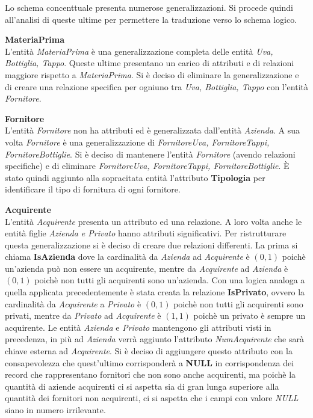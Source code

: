 Lo schema concenttuale presenta numerose generalizzazioni. Si procede quindi all'analisi di queste ultime per permettere la traduzione verso lo schema logico.
\begin{flushleft}
	\textbf{\large{MateriaPrima}}\\
	L'entità \emph{MateriaPrima} è una generalizzazione completa delle entità \emph{Uva, Bottiglia, Tappo}. Queste ultime presentano un carico di attributi e di relazioni maggiore rispetto a \emph{MateriaPrima}. Si è deciso di eliminare la generalizzazione e di creare una relazione specifica per ogniuno tra \emph{Uva, Bottiglia, Tappo} con l'entità \emph{Fornitore}.
\end{flushleft}

\begin{flushleft}
	\textbf{\large{Fornitore}}\\
	L'entità \emph{Fornitore} non ha attributi ed è generalizzata dall'entità \emph{Azienda}. A sua volta \emph{Fornitore} è una generalizzazione di \emph{FornitoreUva, FornitoreTappi, FornitoreBottiglie}. Si è deciso di mantenere l'entità \emph{Fornitore} (avendo relazioni specifiche) e di eliminare \emph{FornitoreUva, FornitoreTappi, FornitoreBottiglie}. È stato quindi aggiunto alla sopracitata entità l'attributo \textbf{Tipologia} per identificare il tipo di fornitura di ogni fornitore.
\end{flushleft}


\begin{flushleft}
	\textbf{\large{Acquirente}}\\
	L'entità \emph{Acquirente} presenta un attributo ed una relazione. A loro volta anche le entità figlie \emph{Azienda e Privato} hanno attributi significativi. Per ristrutturare questa generalizzazione si è deciso di creare due relazioni differenti. La prima si chiama \textbf{IsAzienda} dove la cardinalità da \emph{Azienda} ad \emph{Acquirente} è $(0,1)$ poichè un'azienda può non essere un acquirente, mentre da \emph{Acquirente} ad \emph{Azienda} è $(0,1)$ poichè non tutti gli acquirenti sono un'azienda.
	Con una logica analoga a quella applicata precedentemente è stata creata la relazione \textbf{IsPrivato}, ovvero la cardinalità da \emph{Acquirente} a \emph{Privato} è $(0,1)$ poichè non tutti gli acquirenti sono privati, mentre da \emph{Privato} ad \emph{Acquirente} è $(1,1)$ poichè un privato è sempre un acquirente. Le entità \emph{Azienda} e \emph{Privato} mantengono gli attributi visti in precedenza, in più ad \emph{Azienda} verrà aggiunto l'attributo \emph{NumAcquirente} che sarà chiave esterna ad \emph{Acquirente}. Si è deciso di aggiungere questo attributo con la consapevolezza che quest'ultimo corrisponderà a \textbf{NULL} in corrispondenza dei record che rappresentano fornitori che non sono anche acquirenti, ma poichè la quantità di aziende acquirenti ci si aspetta sia di gran lunga superiore alla quantità dei fornitori non acquirenti, ci si aspetta che i campi con valore \emph{NULL} siano in numero irrilevante.
\end{flushleft}

